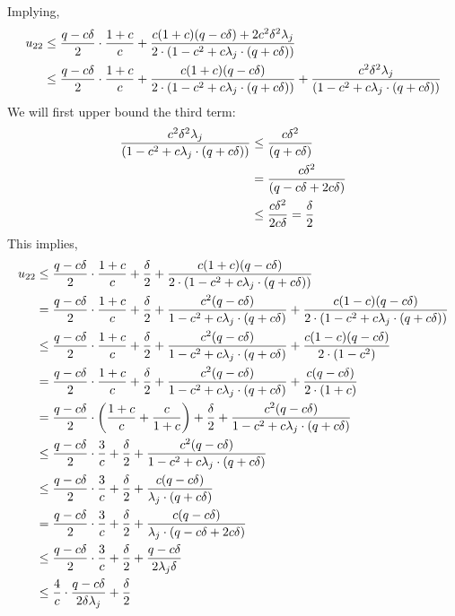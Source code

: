 Implying,
\begin{align*}
u_{22}&\leq\frac{q -c\delta}{2}\cdot\frac{1+c}{c}+\frac{c(1+c)(q -c\delta)+2c^2\delta^2\lambda_j}{2\cdot(1-c^2+c\lambda_j\cdot(q +c\delta))}\nonumber\\
&\leq\frac{q -c\delta}{2}\cdot\frac{1+c}{c}+\frac{c(1+c)(q -c\delta)}{2\cdot(1-c^2+c\lambda_j\cdot(q +c\delta))}+\frac{c^2\delta^2\lambda_j}{(1-c^2+c\lambda_j\cdot(q +c\delta))}
\end{align*}
We will first upper bound the third term:
\begin{align*}
\frac{c^2\delta^2\lambda_j}{(1-c^2+c\lambda_j\cdot(q +c\delta))}&\leq\frac{c\delta^2}{(q +c\delta)}\nonumber\\
&=\frac{c\delta^2}{(q -c\delta+2c\delta)}\nonumber\\
&\leq\frac{c\delta^2}{2c\delta}=\frac{\delta}{2}
\end{align*}
This implies,
\begin{align*}
u_{22}&\leq\frac{q -c\delta}{2}\cdot\frac{1+c}{c}+\frac{\delta}{2}+\frac{c(1+c)(q -c\delta)}{2\cdot(1-c^2+c\lambda_j\cdot(q +c\delta))}\nonumber\\
&=\frac{q -c\delta}{2}\cdot\frac{1+c}{c}+\frac{\delta}{2}+\frac{c^2(q -c\delta)}{1-c^2+c\lambda_j\cdot(q +c\delta)}+\frac{c(1-c)(q -c\delta)}{2\cdot(1-c^2+c\lambda_j\cdot(q +c\delta))}\nonumber\\
&\leq\frac{q -c\delta}{2}\cdot\frac{1+c}{c}+\frac{\delta}{2}+\frac{c^2(q -c\delta)}{1-c^2+c\lambda_j\cdot(q +c\delta)}+\frac{c(1-c)(q -c\delta)}{2\cdot(1-c^2)}\nonumber\\
&=\frac{q -c\delta}{2}\cdot\frac{1+c}{c}+\frac{\delta}{2}+\frac{c^2(q -c\delta)}{1-c^2+c\lambda_j\cdot(q +c\delta)}+\frac{c(q -c\delta)}{2\cdot(1+c)}\nonumber\\
&= \frac{q -c\delta}{2}\cdot\bigg(\frac{1+c}{c}+\frac{c}{1+c}\bigg)+\frac{\delta}{2}+\frac{c^2(q -c\delta)}{1-c^2+c\lambda_j\cdot(q +c\delta)}\nonumber\\
&\leq \frac{q -c\delta}{2}\cdot\frac{3}{c}+\frac{\delta}{2}+\frac{c^2(q -c\delta)}{1-c^2+c\lambda_j\cdot(q +c\delta)}\nonumber\\
&\leq \frac{q -c\delta}{2}\cdot\frac{3}{c}+\frac{\delta}{2}+\frac{c(q -c\delta)}{\lambda_j\cdot(q +c\delta)}\nonumber\\
&= \frac{q -c\delta}{2}\cdot\frac{3}{c}+\frac{\delta}{2}+\frac{c(q -c\delta)}{\lambda_j\cdot(q -c\delta+2c\delta)}\nonumber\\
&\leq \frac{q -c\delta}{2}\cdot\frac{3}{c}+\frac{\delta}{2}+\frac{q -c\delta}{2\lambda_j\delta}\nonumber\\
&\leq \frac{4}{c}\cdot\frac{q -c\delta}{2\delta\lambda_j}+\frac{\delta}{2}
\end{align*}
